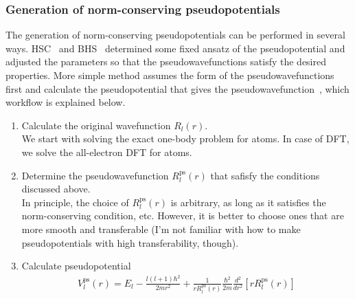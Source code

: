 \documentclass{article}
\begin{document}
\subsubsection{Generation of norm-conserving pseudopotentials}
The generation of norm-conserving pseudopotentials can be performed in several ways. HSC~\cite{PhysRevLett.43.1494} and BHS~\cite{PhysRevB.26.4199} determined some fixed ansatz of the pseudopotential and adjusted the parameters so that the pseudowavefunctions satisfy the desired properties.
More simple method assumes the form of the pseudowavefunctions first and calculate the pseudopotential that gives the pseudowavefunction~\cite{10.1063/1.438197, G_P_Kerker_1980}, which workflow is explained below.
\begin{enumerate}
  \item Calculate the original wavefunction $R_l(r)$.\\
  We start with solving the exact one-body problem for atoms. In case of DFT, we solve the all-electron DFT for atoms.
  \item Determine the pseudowavefunction $R^{\text{ps}}_l(r)$ that safisfy the conditions discussed above.\\
  In principle, the choice of $R^{\text{ps}}_l(r)$ is arbitrary, as long as it satisfies the norm-conserving condition, etc.
  However, it is better to choose ones that are more smooth and transferable (I'm not familiar with how to make pseudopotentials with high transferability, though).
  \item Calculate pseudopotential
  \begin{align}
    V^{\text{ps}}_l(r) = E_l - \frac{l(l+1)\hbar^2}{2mr^2} + \frac{1}{rR^{\text{ps}}_l(r)}  \frac{\hbar^2}{2m} \frac{d^2}{dr^2} [rR^{\text{ps}}_l(r)]
  \end{align}
\end{enumerate}
\end{document}
